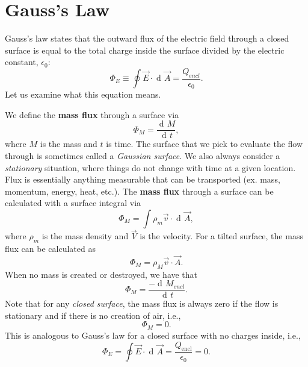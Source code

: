 \documentclass[11pt, letterpaper, titlepage]{report}
\title{\textbf{\Huge{ \begin{center}
Physics 230 Notes\\ %
\end{center} }}}
\author{ Lora Ma and Benjamin Kong\\}
\DeclareMathOperator{\di}{d\!} %
\begin{document}
\maketitle

\maketitle %
{
  \hypersetup{}
  \parskip 0pt
  \tableofcontents
} %
\newpage
{}
\pagestyle{mypagestyle}



\section{Gauss's Law}
Gauss's law states that the outward flux of the electric field through a closed surface is equal to the total charge inside the surface divided by the electric constant, $\epsilon_0$:
\begin{equation}
\Phi_E \equiv \oint \vec{E}\cdot \di \vec{A} = \frac{Q_{encl}}{\epsilon_0}.
\end{equation}
Let us examine what this equation means.

We define the \textbf{mass flux} through a surface via
\begin{equation}
\Phi_M = \dfrac{\di M}{\di t},
\end{equation}
where $M$ is the mass and $t$ is time. The surface that we pick to evaluate the flow through is sometimes called a \textit{Gaussian surface}. We also always consider a \textit{stationary} situation, where things do not change with time at a given location. Flux is essentially anything measurable that can be transported (ex. mass, momentum, energy, heat, etc.). The \textbf{mass flux} through a surface can be calculated with a surface integral via
\begin{equation}
\Phi_M = \int \rho_m \vec{v} \cdot \di \vec{A},
\end{equation}
where $\rho_m$ is the mass density and $\vec{V}$ is the velocity. For a tilted surface, the mass flux can be calculated as
\begin{equation}
\Phi_M = \rho_M \vec{v} \cdot \vec{A}.
\end{equation}
When no mass is created or destroyed, we have that
\begin{equation}
\Phi_M = \frac{-\di M_{encl}}{\di t}.
\end{equation}
Note that for any \textit{closed surface}, the mass flux is always zero if the flow is stationary and if there is no creation of air, i.e.,
\begin{equation}
\Phi_M = 0.
\end{equation} 
This is analogous to Gauss's law for a closed surface with no charges inside, i.e.,
\begin{equation}
\Phi_E = \oint \vec{E} \cdot \di \vec{A} = \dfrac{Q_\text{encl}}{\epsilon_0} = 0.
\end{equation}
\end{document}
